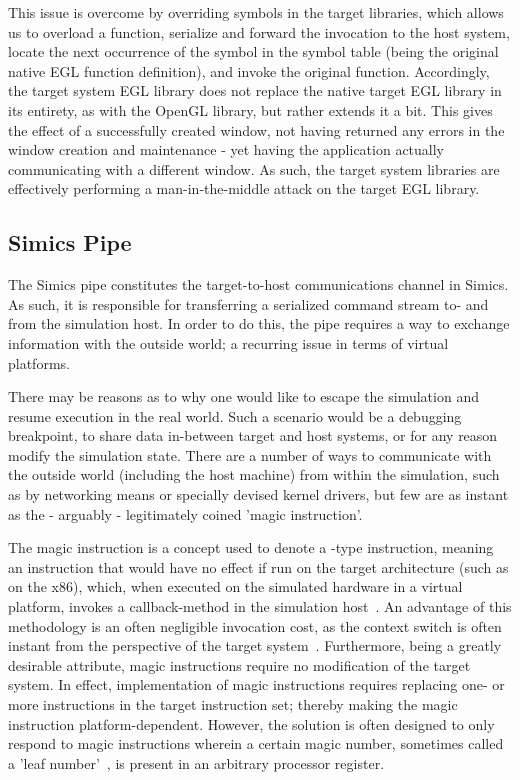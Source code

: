 This issue is overcome by overriding symbols in the target libraries, which allows us to overload a function, serialize and forward the invocation to the host system, locate the next occurrence of the symbol in the symbol table (being the original native EGL function definition), and invoke the original function.
Accordingly, the target system EGL library does not replace the native target EGL library in its entirety, as with the OpenGL library, but rather extends it a bit.
This gives the effect of a successfully created window, not having returned any errors in the window creation and maintenance - yet having the application actually communicating with a different window.
As such, the target system libraries are effectively performing a man-in-the-middle attack on the target EGL library.

\subsection{Simics Pipe}
\label{sec:proposedsolutionandimplementation_simicspipe}
The Simics pipe constitutes the target-to-host communications channel in Simics.
As such, it is responsible for transferring a serialized command stream to- and from the simulation host.
In order to do this, the pipe requires a way to exchange information with the outside world; a recurring issue in terms of virtual platforms.

There may be reasons as to why one would like to escape the simulation and resume execution in the real world.
Such a scenario would be a debugging breakpoint, to share data in-between target and host systems, or for any reason modify the simulation state.
There are a number of ways to communicate with the outside world (including the host machine) from within the simulation, such as by networking means or specially devised kernel drivers, but few are as instant as the - arguably - legitimately coined 'magic instruction'.

The magic instruction is a concept used to denote a -type instruction, meaning an instruction that would have no effect if run on the target architecture (such as  on the x86), which, when executed on the simulated hardware in a virtual platform, invokes a callback-method in the simulation host~.
An advantage of this methodology is an often negligible invocation cost, as the context switch is often instant from the perspective of the target system~.
Furthermore, being a greatly desirable attribute, magic instructions require no modification of the target system.
In effect, implementation of magic instructions requires replacing one- or more instructions in the target instruction set; thereby making the magic instruction platform-dependent.
However, the solution is often designed to only respond to magic instructions wherein a certain magic number, sometimes called a 'leaf number'~, is present in an arbitrary processor register.


